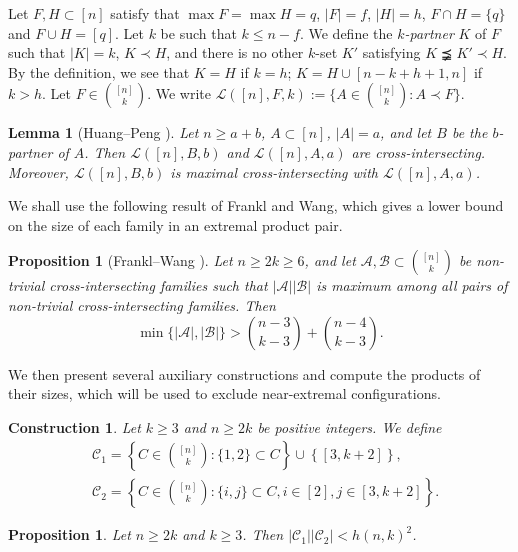 \documentclass[a4paper,11pt]{article}
\newtheorem{construction}[theorem]{Construction}
\newtheorem{lemma}[theorem]{Lemma}
\newtheorem{proposition}[theorem]{Proposition}
\newcommand{\m}{\mathcal}
\begin{document}
Let $F, H \subset [n]$ satisfy that $\max F=\max H=q$, $|F|=f$, $|H|=h$, $F\cap H=\{q\}$ and $F\cup H=[q]$. Let $k$ be such that $k\leq n-f$. 
We define the {\it $k$-partner} $K$ of $F$ such that $|K|=k$, $K\prec H$, and there is no other $k$-set $K'$ satisfying $K\precneqq K'\prec H$. By the definition, we see that $K=H$ if $k=h$; $K= H\cup [n-k+h+1, n]$ if $k>h$. 
Let $F\in {[n]\choose k}$. We write $\m L([n], F, k):=\{A\in {[n]\choose k}: A\prec F\}$. 

 
\begin{lemma}[Huang--Peng \cite{k_1+k_3}]\label{3-12-1}
Let $n\ge a+b$, $A\subset [n]$, $|A|=a$, and let $B$ be the $b$-partner of $A$. Then
$\mathcal{L}([n], B, b)$ and $\mathcal{L}([n], A, a)$ are cross-intersecting. Moreover, $\mathcal{L}([n], B, b)$ is maximal cross-intersecting with $\mathcal{L}([n], A, a)$.
\end{lemma}

We shall use the following result of Frankl and Wang, which gives a lower bound on the size of each family in an extremal product pair.

\begin{proposition}[Frankl--Wang \cite{11-6-1}]\label{1-29-1}
Let $n\ge 2k\ge 6$, and let $\mathcal{A}, \mathcal{B} \subset {[n]\choose k}$ be non-trivial cross-intersecting families such that $|\m A||\m B|$ is maximum among all pairs of non-trivial  cross-intersecting families.  Then 
\begin{equation}\label{minAB}
\min \{|\m A|, |\m B|\}>{n-3\choose k-3}+{n-4\choose k-3}.    
\end{equation}
\end{proposition}


We then present several auxiliary constructions and compute the products of their sizes, which will be used to exclude near-extremal configurations.

\begin{construction}\label{2-27-1}
 Let $k\ge 3$ and $n\ge 2k$ be positive integers. We define 
    \begin{align*}
        &\m C_1=\left\{C\in {[n]\choose k}: \{1,2\}\subset C\right\} \cup \left\{[3,k+2]\right\},\\
        &\m C_2=\left\{C\in {[n]\choose k}: \{i,j\}\subset C, i\in [2],j\in [3,k+2]\right\}.
    \end{align*}
\end{construction}

\begin{proposition}\label{3-11-2}
Let $n\ge 2k$ and $k\ge 3$. Then $ |\m C_1||\m C_2|<h(n,k)^2$.
\end{proposition}
\end{document}
